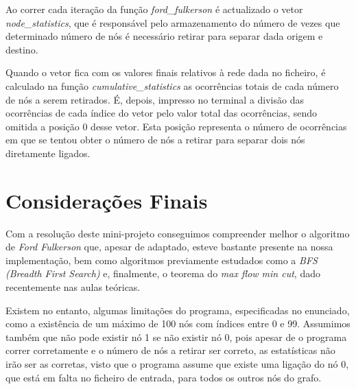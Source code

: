 \documentclass[a4paper]{article}
\begin{document}
Ao correr cada iteração da função \textit{ford\_fulkerson} é actualizado o vetor \textit{node\_statistics}, que é responsável pelo armazenamento do número de vezes que determinado número de nós é necessário retirar para separar dada origem e destino.

Quando o vetor fica com os valores finais relativos à rede dada no ficheiro, é calculado na função \textit{cumulative\_statistics} as ocorrências totais de cada número de nós a serem retirados. É, depois, impresso no terminal a divisão das ocorrências de cada índice do vetor pelo valor total das ocorrências, sendo omitida a posição 0 desse vetor. Esta posição representa o número de ocorrências em que se tentou obter o número de nós a retirar para separar dois nós diretamente ligados. 


\section{Considerações Finais}
Com a resolução deste mini-projeto conseguimos compreender melhor o algoritmo de \textit{Ford Fulkerson} que, apesar de adaptado, esteve bastante presente na nossa implementação, bem como algoritmos previamente estudados como a \textit{BFS (Breadth First Search)} e, finalmente, o teorema do \textit{max flow min cut}, dado recentemente nas aulas teóricas.

Existem no entanto, algumas limitações do programa, especificadas no enunciado, como a existência de um máximo de 100 nós com índices entre 0 e 99. Assumimos também que não pode existir nó 1 se não existir nó 0, pois apesar de o programa correr corretamente e o número de nós a retirar ser correto, as estatísticas não irão ser as corretas, visto que o programa assume que existe uma ligação do nó 0, que está em falta no ficheiro de entrada, para todos os outros nós do grafo.
\end{document}
